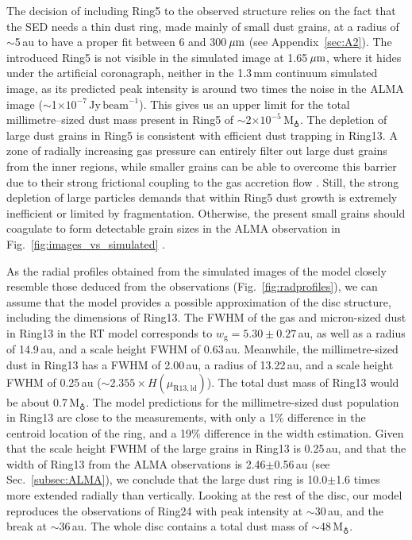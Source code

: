 \documentclass[fleqn,usenatbib,useAMS]{mnras}
\begin{document}
The decision of including Ring5 to the observed structure relies on the fact that the SED needs a thin dust ring, made mainly of small dust grains, at a radius of $\sim$5\,au to have a proper fit between 6 and 300\,$\hbox{$\mu$m}$ (see Appendix~\ref{sec:A2}). The introduced Ring5 is not visible in the simulated image at 1.65\,$\hbox{$\mu$m}$, where it hides under the artificial coronagraph, neither in the 1.3\,mm continuum simulated image, as its predicted peak intensity is around two times the noise in the ALMA image ($\sim$1$\times10^{-7}$\,Jy\,$\mathrm{beam}^{-1}$). This gives us an upper limit for the total millimetre--sized dust mass present in Ring5 of $\sim$2$\times10^{-5}$\,M$_{\earth}$. The depletion of large dust grains in Ring5 is consistent with efficient dust trapping in Ring13. A zone of radially increasing gas pressure can entirely filter out large dust grains from the inner regions, while smaller grains can be able to overcome this barrier due to their strong frictional coupling to the gas accretion flow \citep[studied in the context of planetary gaps,][]{Rice2006,Zhu2012,Weber2018}. Still, the strong depletion of large particles demands that within Ring5 dust growth is extremely inefficient or limited by fragmentation. Otherwise, the present small grains should coagulate to form detectable grain sizes in the ALMA observation in Fig.~\ref{fig:images_vs_simulated} \citep{Drazkowska2019}. 

As the radial profiles obtained from the simulated images of the model closely resemble those deduced from the observations (Fig.~\ref{fig:radprofiles}), we can assume that the model provides a possible approximation of the disc structure, including the dimensions of Ring13. The FWHM of the gas and micron-sized dust in Ring13 in the RT model corresponds to $w_\mathrm{g} = 5.30\pm0.27$\,au, as well as a radius of 14.9\,au, and a scale height FWHM of 0.63\,au. Meanwhile, the millimetre-sized dust in Ring13 has a FWHM of 2.00\,au, a radius of 13.22\,au, and a scale height FWHM of 0.25\,au ($\sim2.355\times H(\mu_\mathrm{R13,ld})$). The total dust mass of Ring13 would be about 0.7\,M$_{\earth}$. The model predictions for the millimetre-sized dust population in Ring13 are close to the measurements, with only a 1\% difference in the centroid location of the ring, and a 19\% difference in the width estimation. Given that the scale height FWHM of the large grains in Ring13 is 0.25\,au, and that the width of Ring13 from the ALMA observations is 2.46$\pm$0.56\,au (see Sec.~\ref{subsec:ALMA}), we conclude that the large dust ring is 10.0$\pm$1.6 times more extended radially than vertically. Looking at the rest of the disc, our model reproduces the observations of Ring24 with peak intensity at $\sim$30\,au, and the break at $\sim$36\,au. The whole disc contains a total dust mass of $\sim$48\,M$_{\earth}$.
\end{document}

